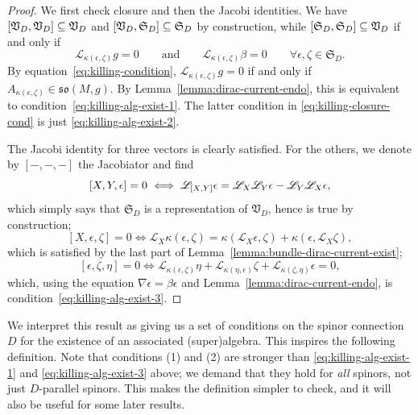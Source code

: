 \documentclass[11pt]{article}
\numberwithin{equation}{section}
\numberwithin{equation}{section}
\newcommand{\fso}{\mathfrak{so}}
\newcommand{\fS}{\mathfrak{S}}
\newcommand{\fV}{\mathfrak{V}}
\newcommand{\eL}{\mathscr{L}}
\newcommand{\1}{\mathbbm{1}}
\begin{document}
\begin{proof}
	We first check closure and then the Jacobi identities. We have $\comm{\fV_D}{\fV_D}\subseteq\fV_D$ and $\comm{\fV_D}{\fS_D}\subseteq \fS_D$ by construction, while $\comm{\fS_D}{\fS_D}\subseteq\fV_D$ if and only if
	\begin{equation}\label{eq:killing-closure-cond}
		\eL_{\kappa(\epsilon,\zeta)}g = 0
		\qquad\text{and}\qquad
		\eL_{\kappa(\epsilon,\zeta)}\beta = 0 \qquad \forall\epsilon,\zeta\in\fS_D.
	\end{equation}
	By equation~\eqref{eq:killing-condition}, $\eL_{\kappa(\epsilon,\zeta)}g = 0$ if and only if $A_{\kappa(\epsilon,\zeta)}\in\fso(M,g)$. By Lemma~\ref{lemma:dirac-current-endo}, this is equivalent to condition~\eqref{eq:killing-alg-exist-1}. The latter condition in \eqref{eq:killing-closure-cond} is just \eqref{eq:killing-alg-exist-2}.
	
	The Jacobi identity for three vectors is clearly satisfied. For the others, we denote by $[-,-,-]$ the Jacobiator and find
	\[
		[X,Y,\epsilon]= 0 \iff \eL_{\comm{X}{Y}} \epsilon = \eL_X \eL_Y \epsilon - \eL_Y \eL_X \epsilon,
	\]
	which simply says that $\fS_D$ is a representation of $\fV_D$, hence is true by construction;
	\[
		[X,\epsilon,\zeta]= 0 \iff \eL_X \kappa(\epsilon,\zeta) = \kappa(\eL_X\epsilon,\zeta) + \kappa(\epsilon,\eL_X\zeta),
	\]
	which is satisfied by the last part of Lemma~\ref{lemma:bundle-dirac-current-exist};
	\[
		[\epsilon,\zeta,\eta] = 0 \iff \eL_{\kappa(\epsilon,\zeta)} \eta + \eL_{\kappa(\eta,\epsilon)} \zeta + \eL_{\kappa(\zeta,\eta)} \epsilon = 0,
	\]
	which, using the equation $\nabla \epsilon=\beta\epsilon$ and Lemma~\ref{lemma:dirac-current-endo}, is condition~\eqref{eq:killing-alg-exist-3}.
\end{proof}

We interpret this result as giving us a set of conditions on the spinor connection $D$ for the existence of an associated (super)algebra. This inspires the following definition. Note that conditions (1) and (2) are stronger than \eqref{eq:killing-alg-exist-1} and \eqref{eq:killing-alg-exist-3} above; we demand that they hold for \emph{all} spinors, not just $D$-parallel spinors. This makes the definition simpler to check, and it will also be useful for some later results.
\end{document}
